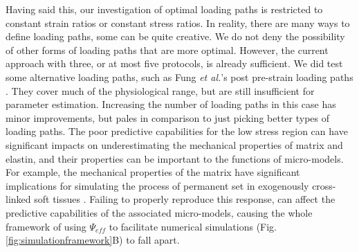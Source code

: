     
    Having said this, our investigation of optimal loading paths is restricted to constant strain ratios or constant stress ratios. In reality, there are many ways to define loading paths, some can be quite creative. We do not deny the possibility of other forms of loading paths that are more optimal. However, the current approach with three, or at most five protocols, is already sufficient. We did test some alternative loading paths, such as Fung \textit{et al.}'s post pre-strain loading paths \cite{fung_pseudoelasticity_1979}. They cover much of the physiological range, but are still insufficient for parameter estimation. Increasing the number of loading paths in this case has minor improvements, but pales in comparison to just picking better types of loading paths. The poor predictive capabilities for the low stress region can have significant impacts on underestimating the mechanical properties of matrix and elastin, and their properties can be important to the functions of micro-models. For example, the mechanical properties of the matrix have significant implications for simulating the process of permanent set in exogenously cross-linked soft tissues \cite{zhang_modeling_2017}. Failing to properly reproduce this response, can affect the predictive capabilities of the associated micro-models, causing the whole framework of using $\Psi_{eff}$ to facilitate numerical simulations (Fig. \ref{fig:simulationframework}B) to fall apart. 
    
    








